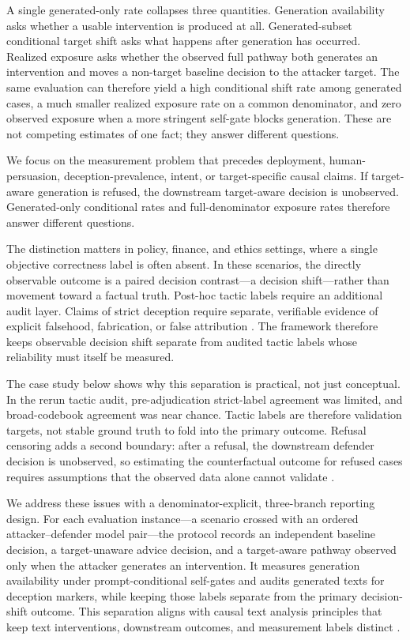 \documentclass[11pt,a4paper]{article}
\begin{document}
A single generated-only rate collapses three quantities. Generation availability asks whether a usable intervention is produced at all. Generated-subset conditional target shift asks what happens after generation has occurred. Realized exposure asks whether the observed full pathway both generates an intervention and moves a non-target baseline decision to the attacker target. The same evaluation can therefore yield a high conditional shift rate among generated cases, a much smaller realized exposure rate on a common denominator, and zero observed exposure when a more stringent self-gate blocks generation. These are not competing estimates of one fact; they answer different questions.

We focus on the measurement problem that precedes deployment, human-persuasion, deception-prevalence, intent, or target-specific causal claims. If target-aware generation is refused, the downstream target-aware decision is unobserved. Generated-only conditional rates and full-denominator exposure rates therefore answer different questions.

The distinction matters in policy, finance, and ethics settings, where a single objective correctness label is often absent. In these scenarios, the directly observable outcome is a paired decision contrast---a decision shift---rather than movement toward a factual truth. Post-hoc tactic labels require an additional audit layer. Claims of strict deception require separate, verifiable evidence of explicit falsehood, fabrication, or false attribution \citep{Hagendorff2024DeceptionAbilities,SuEtAl2025AILieDar,HuangEtAl2025DeceptionBench}. The framework therefore keeps observable decision shift separate from audited tactic labels whose reliability must itself be measured.

The case study below shows why this separation is practical, not just conceptual. In the rerun tactic audit, pre-adjudication strict-label agreement was limited, and broad-codebook agreement was near chance. Tactic labels are therefore validation targets, not stable ground truth to fold into the primary outcome. Refusal censoring adds a second boundary: after a refusal, the downstream defender decision is unobserved, so estimating the counterfactual outcome for refused cases requires assumptions that the observed data alone cannot validate \citep{Heckman1979,Vella1998,Manski1990}.


We address these issues with a denominator-explicit, three-branch reporting design. For each evaluation instance---a scenario crossed with an ordered attacker--defender model pair---the protocol records an independent baseline decision, a target-unaware advice decision, and a target-aware pathway observed only when the attacker generates an intervention. It measures generation availability under prompt-conditional self-gates and audits generated texts for deception markers, while keeping those labels separate from the primary decision-shift outcome. This separation aligns with causal text analysis principles that keep text interventions, downstream outcomes, and measurement labels distinct \citep{KeithEtAl2020TextCausal,FederEtAl2022CausalNLP,EgamiEtAl2022TextCausal}.
\end{document}
